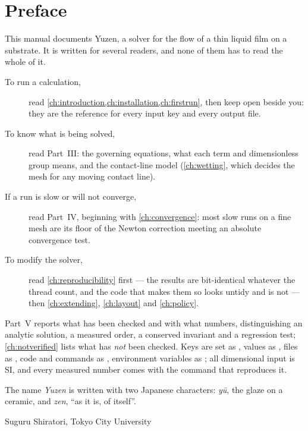 \chapter*{Preface}

This manual documents Yuzen, a solver for the flow of a thin liquid film on a
substrate. It is written for several readers, and none of them has to read the
whole of it.

\begin{description}
  \item[To run a calculation,] read \cref{ch:introduction,ch:installation,ch:firstrun},
    then keep  open beside you: they are
    the reference for every input key and every output file.
  \item[To know what is being solved,] read Part~III: the governing equations,
    what each term and dimensionless group means, and the contact-line model
    (\cref{ch:wetting}, which decides the mesh for any moving contact line).
  \item[If a run is slow or will not converge,] read Part~IV, beginning with
    \cref{ch:convergence}: most slow runs on a fine mesh are its floor of the
    Newton correction meeting an absolute convergence test.
  \item[To modify the solver,] read \cref{ch:reproducibility} first --- the
    results are bit-identical whatever the thread count, and the code that
    makes them so looks untidy and is not --- then \cref{ch:extending},
    \cref{ch:layout} and \cref{ch:policy}.
\end{description}

Part~V reports what has been checked and with what numbers, distinguishing
an analytic solution, a measured order, a conserved invariant and a regression
test; \cref{ch:notverified} lists what has \emph{not} been checked. Keys are
set as , values as , files as
, code and commands as , environment
variables as ; all dimensional input is SI, and every
measured number comes with the command that reproduces it.

The name \emph{Yuzen} is written with two Japanese characters: \emph{y\=u},
the glaze on a ceramic, and \emph{zen}, ``as it is, of itself''.

\medskip
\hfill Suguru Shiratori, Tokyo City University
